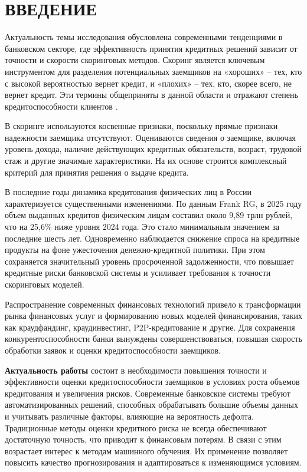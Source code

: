\section*{ВВЕДЕНИЕ}

Актуальность темы исследования обусловлена современными тенденциями в банковском секторе, где эффективность принятия кредитных решений зависит от точности и скорости скоринговых методов. Скоринг является ключевым инструментом для разделения потенциальных заемщиков на «хороших» -- тех, кто с высокой вероятностью вернет кредит, и «плохих» -- тех, кто, скорее всего, не вернет кредит. Эти термины общеприняты в данной области и отражают степень кредитоспособности клиентов \cite{Didikin}.

В скоринге используются косвенные признаки, поскольку прямые признаки надежности заемщика отсутствуют. Оцениваются сведения о заемщике, включая уровень дохода, наличие действующих кредитных обязательств, возраст, трудовой стаж и другие значимые характеристики. На их основе строится комплексный критерий для принятия решения о выдаче кредита.

В последние годы динамика кредитования физических лиц в России характеризуется существенными изменениями. По данным Frank RG, в 2025 году объем выданных кредитов физическим лицам составил около 9{,}89 трлн рублей, что на 25{,}6\% ниже уровня 2024 года. Это стало минимальным значением за последние шесть лет. \cite{FrankRG} Одновременно наблюдается снижение спроса на кредитные продукты на фоне ужесточения денежно-кредитной политики. При этом сохраняется значительный уровень просроченной задолженности, что повышает кредитные риски банковской системы и усиливает требования к точности скоринговых моделей.

Распространение современных финансовых технологий привело к трансформации рынка финансовых услуг и формированию новых моделей финансирования, таких как краудфандинг, краудинвестинг, P2P-кредитование и другие. Для сохранения конкурентоспособности банки вынуждены совершенствоваться, повышая скорость обработки заявок и оценки кредитоспособности заемщиков.


\textbf{Актуальность работы} состоит в необходимости повышения точности и эффективности оценки кредитоспособности заемщиков в условиях роста объемов кредитования и увеличения рисков. Современные банковские системы требуют автоматизированных решений, способных обрабатывать большие объемы данных и учитывать различные факторы, влияющие на вероятность дефолта. Традиционные методы оценки кредитного риска не всегда обеспечивают достаточную точность, что приводит к финансовым потерям. В связи с этим возрастает интерес к методам машинного обучения. Их применение позволяет повысить качество прогнозирования и адаптироваться к изменяющимся условиям.

